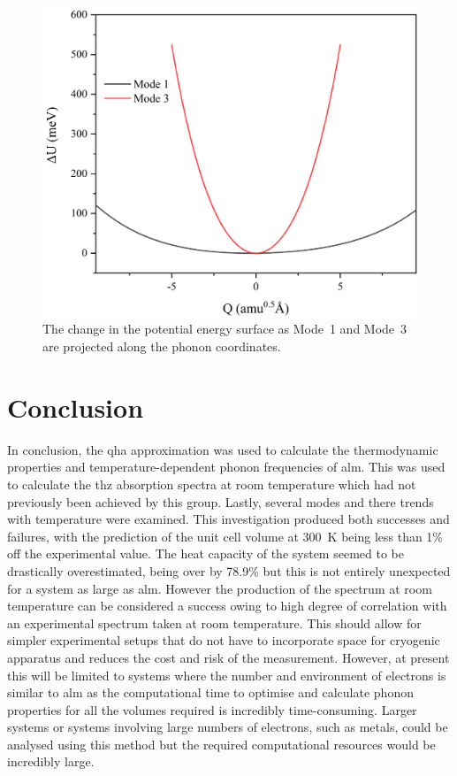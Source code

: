 \begin{figure}[t]
\centering
\includegraphics[scale=0.5]{Figures/Misc/QHA/ModeMapComparison.png}
\captionsetup{font = footnotesize, justification = centering}
\caption[The Change in the Potential Energy Surface as Mode~1 and Mode~3 are Projected along the Phonon Coordinates]{The change in the potential energy surface as Mode~1 and Mode~3 are projected along the phonon coordinates.}
\label{fig:modemap}
\end{figure}

\section{Conclusion}
In conclusion, the \acrshort{qha} approximation was used to calculate the thermodynamic properties and temperature\nobreakdash-dependent phonon frequencies of \acrshort{alm}. This was used to calculate the \acrshort{thz} absorption spectra at room temperature which had not previously been achieved by this group. Lastly, several modes and there trends with temperature were examined. This investigation produced both successes and failures, with the prediction of the unit cell volume at \SI{300}{K} being less than 1\% off the experimental value. The heat capacity of the system seemed to be drastically overestimated, being over by 78.9\% but this is not entirely unexpected for a system as large as \acrshort{alm}. However the production of the spectrum at room temperature can be considered a success owing to high degree of correlation with an experimental spectrum taken at room temperature. This should allow for simpler experimental setups that do not have to incorporate space for cryogenic apparatus and reduces the cost and risk of the measurement. However, at present this will be limited to systems where the number and environment of electrons is similar to \acrshort{alm} as the computational time to optimise and calculate phonon properties for all the volumes required is incredibly time\nobreakdash-consuming. Larger systems or systems involving large numbers of electrons, such as metals, could be analysed using this method but the required computational resources would be incredibly large. 
